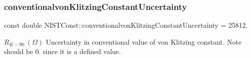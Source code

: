 \subsubsection{\texorpdfstring{conventionalvon\+Klitzing\+Constant\+Uncertainty}{conventionalvonKlitzingConstantUncertainty}}
{\footnotesize\ttfamily const double N\+I\+S\+T\+Const\+::conventionalvon\+Klitzing\+Constant\+Uncertainty = 25812.}

$R_{K-90} \ (\Omega)$ Uncertainty in conventional value of von Klitzing constant. Note should be 0. since it is a defined value. 